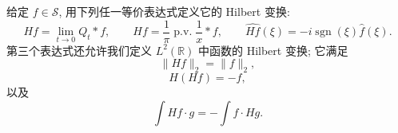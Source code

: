 给定 $f\in\mathcal S$, 用下列任一等价表达式定义它的 Hilbert 变换:
\[
 Hf=\lim_{t\to0}Q_t*f,
 \qquad
 Hf=\frac1\pi\operatorname{p.v.}\frac1x*f,
 \qquad
 \widehat{Hf}(\xi)=-i\operatorname{sgn}(\xi)\widehat f(\xi).
\]
第三个表达式还允许我们定义 $L^2(\mathbb R)$ 中函数的 Hilbert 变换; 它满足
\begin{equation}
\label{eq:ch3-hilbert-l2-isometry}
 \|Hf\|_2=\|f\|_2,
\end{equation}
\begin{equation}
\label{eq:ch3-hilbert-square-minus-identity}
 H(Hf)=-f,
\end{equation}
以及
\begin{equation}
\label{eq:ch3-hilbert-skew-adjoint}
 \int Hf\cdot g=-\int f\cdot Hg.
\end{equation}
